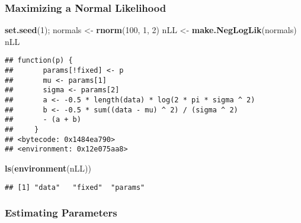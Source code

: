 \documentclass[
]{article}
\newenvironment{Shaded}{\begin{snugshade}}{\end{snugshade}}
\newcommand{\AttributeTok}[1]{\textcolor[rgb]{0.13,0.29,0.53}{#1}}
\newcommand{\DecValTok}[1]{\textcolor[rgb]{0.00,0.00,0.81}{#1}}
\newcommand{\FunctionTok}[1]{\textcolor[rgb]{0.13,0.29,0.53}{\textbf{#1}}}
\newcommand{\NormalTok}[1]{#1}
\newcommand{\OtherTok}[1]{\textcolor[rgb]{0.56,0.35,0.01}{#1}}
\newcommand{\SpecialCharTok}[1]{\textcolor[rgb]{0.81,0.36,0.00}{\textbf{#1}}}
\begin{document}
\hypertarget{maximizing-a-normal-likelihood-1}{%
\subsubsection{Maximizing a Normal
Likelihood}\label{maximizing-a-normal-likelihood-1}}

\begin{Shaded}
\begin{Highlighting}[]
\FunctionTok{set.seed}\NormalTok{(}\DecValTok{1}\NormalTok{); normals }\OtherTok{\textless{}{-}} \FunctionTok{rnorm}\NormalTok{(}\DecValTok{100}\NormalTok{, }\DecValTok{1}\NormalTok{, }\DecValTok{2}\NormalTok{)}
\NormalTok{nLL }\OtherTok{\textless{}{-}} \FunctionTok{make.NegLogLik}\NormalTok{(normals)}
\NormalTok{nLL}
\end{Highlighting}
\end{Shaded}

\begin{verbatim}
## function(p) {
##       params[!fixed] <- p
##       mu <- params[1]
##       sigma <- params[2]
##       a <- -0.5 * length(data) * log(2 * pi * sigma ^ 2) 
##       b <- -0.5 * sum((data - mu) ^ 2) / (sigma ^ 2) 
##       - (a + b)
##     }
## <bytecode: 0x1484ea790>
## <environment: 0x12e075aa8>
\end{verbatim}

\begin{Shaded}
\begin{Highlighting}[]
\FunctionTok{ls}\NormalTok{(}\FunctionTok{environment}\NormalTok{(nLL))}
\end{Highlighting}
\end{Shaded}

\begin{verbatim}
## [1] "data"   "fixed"  "params"
\end{verbatim}

\hypertarget{estimating-parameters}{%
\subsubsection{Estimating Parameters}\label{estimating-parameters}}

\begin{Shaded}
\end{Shaded}
\end{document}
